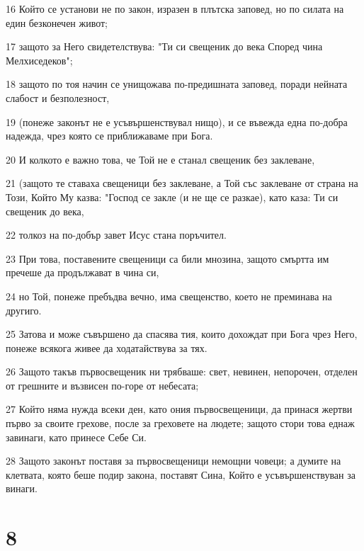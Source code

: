 \par 16 Който се установи не по закон, изразен в плътска заповед, но по силата на един безконечен живот;
\par 17 защото за Него свидетелствува: "Ти си свещеник до века Според чина Мелхиседеков";
\par 18 защото по тоя начин се унищожава по-предишната заповед, поради нейната слабост и безполезност,
\par 19 (понеже законът не е усъвършенствувал нищо), и се въвежда една по-добра надежда, чрез която се приближаваме при Бога.
\par 20 И колкото е важно това, че Той не е станал свещеник без заклеване,
\par 21 (защото те ставаха свещеници без заклеване, а Той със заклеване от страна на Този, Който Му казва: "Господ се закле (и не ще се разкае), като каза: Ти си свещеник до века,
\par 22 толкоз на по-добър завет Исус стана поръчител.
\par 23 При това, поставените свещеници са били мнозина, защото смъртта им пречеше да продължават в чина си,
\par 24 но Той, понеже пребъдва вечно, има свещенство, което не преминава на другиго.
\par 25 Затова и може съвършено да спасява тия, които дохождат при Бога чрез Него, понеже всякога живее да ходатайствува за тях.
\par 26 Защото такъв първосвещеник ни трябваше: свет, невинен, непорочен, отделен от грешните и възвисен по-горе от небесата;
\par 27 Който няма нужда всеки ден, като ония първосвещеници, да принася жертви първо за своите грехове, после за греховете на людете; защото стори това еднаж завинаги, като принесе Себе Си.
\par 28 Защото законът поставя за първосвещеници немощни човеци; а думите на клетвата, която беше подир закона, поставят Сина, Който е усъвършенствуван за винаги.

\chapter{8}

